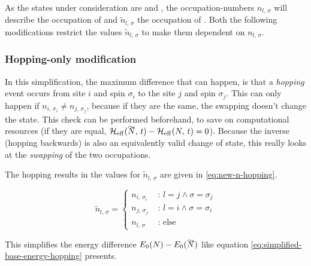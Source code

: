 As the states under consideration are \ketN[N] and , the occupation-numbers $n_{l,\,\sigma}$ will describe the occupation of \ketN[N] and $\tilde{n}_{l,\,\sigma}$ the occupation of .
Both the following modifications restrict the values $\tilde{n}_{l,\,\sigma}$ to make them dependent on $n_{l,\,\sigma}$.

\subsubsection*{Hopping-only modification}


In this simplification, the maximum difference that can happen, is that a \emph{hopping} event occurs from site $i$ and spin $\sigma_i$ to the site $j$ and spin $\sigma_j$. 
This can only happen if $n_{i,\,\sigma_i} \neq n_{j,\,\sigma_j}$, because if they are the same, the swapping doesn't change the state. 
This check can be performed beforehand, to save on computational resources (if they are equal, $\HeffOft[\vphantom{N}\smash{\tilde{N}}]-\HeffOft[N] = 0$).
Because the inverse (hopping backwards) is also an equivalently valid change of state, this really looks at the \emph{swapping} of the two occupations.

The hopping results in the values for $\tilde{n}_{l,\,\sigma}$ are given in \autoref{eq:new-n-hopping}.

\begin{equation}
    \label{eq:new-n-hopping}
    \tilde{n}_{l,\,\sigma} = \begin{cases}
        n_{i,\,\sigma_i}&\text{ : } l = j \land \sigma = \sigma_j   \\
        n_{j,\,\sigma_j}&\text{ : } l = i \land \sigma = \sigma_i   \\
        n_{l,\,\sigma} &\text{ : else}
    \end{cases}
\end{equation}

This simplifies the energy difference $E_0(N)-E_0(\vphantom{N}\smash{\tilde{N}})$ like equation \autoref{eq:simplified-base-energy-hopping} presents.

